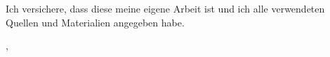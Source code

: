 \thispagestyle{empty}
\vspace*{0.8\textheight}
\noindent
Ich versichere, dass diese \MakeLowercase{\getDoctype{}} meine eigene Arbeit ist und ich alle verwendeten Quellen und Materialien angegeben habe.

\vspace{15mm}
\noindent
\getSubmissionLocation{}, \getSubmissionDate{} \hspace{50mm} \getAuthor{}

\cleardoublepage{}

